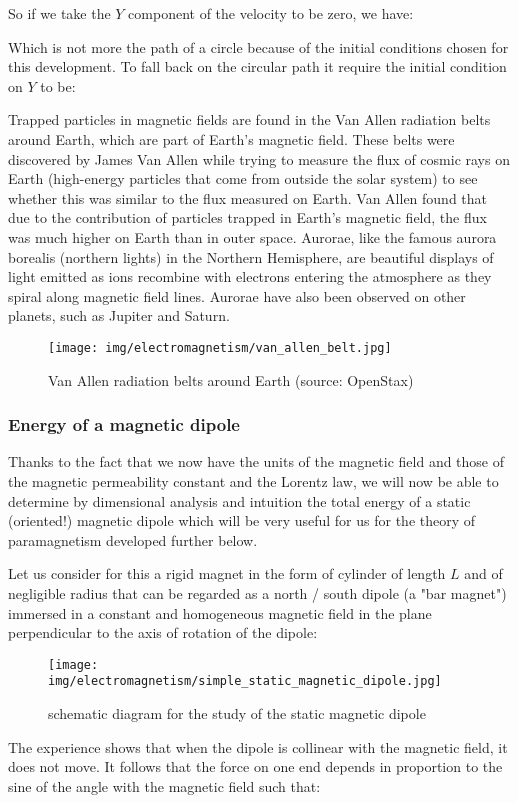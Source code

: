	So if we take the $Y$ component of the velocity to be zero, we have:
	
	Which is not more the path of a circle because of the initial conditions chosen for this development. To fall back on the circular path it require the initial condition on $Y$ to be:
	
	Trapped particles in magnetic fields are found in the Van Allen radiation belts around Earth, which are part of Earth’s magnetic field. These belts were discovered by James Van Allen while trying to measure the flux of cosmic rays on Earth (high-energy particles that come from outside the solar system) to see whether this was similar to the flux measured on Earth. Van Allen found that due to the contribution of particles trapped in Earth’s magnetic field, the flux was much higher on Earth than in outer space. Aurorae, like the famous aurora borealis (northern lights) in the Northern Hemisphere, are beautiful displays of light emitted as ions recombine with electrons entering the atmosphere as they spiral along magnetic field lines. Aurorae have also been observed on other planets, such as Jupiter and Saturn.
	\begin{figure}[H]
		\centering
		\texttt{[image: img/electromagnetism/van\_allen\_belt.jpg]}
		\caption[Van Allen radiation belts around Earth]{Van Allen radiation belts around Earth (source: OpenStax)}
	\end{figure}
	
	\pagebreak
	\subsubsection{Energy of a magnetic dipole}
	Thanks to the fact that we now have the units of the magnetic field and those of the magnetic permeability constant and the Lorentz law, we will now be able to determine by dimensional analysis and intuition the total energy of a static (oriented!) magnetic dipole which will be very useful for us for the theory of paramagnetism developed further below.

	Let us consider for this a rigid magnet in the form of cylinder of length $L$ and of negligible radius that can be regarded as a north / south dipole (a "bar magnet") immersed in a constant and homogeneous magnetic field in the plane perpendicular to the axis of rotation of the dipole:
	\begin{figure}[H]
		\centering
		\texttt{[image: img/electromagnetism/simple\_static\_magnetic\_dipole.jpg]}
		\caption[]{schematic diagram for the study of the static magnetic dipole}
	\end{figure}
	The experience shows that when the dipole is collinear with the magnetic field, it does not move. It follows that the force on one end depends in proportion to the sine of the angle with the magnetic field such that:
	

